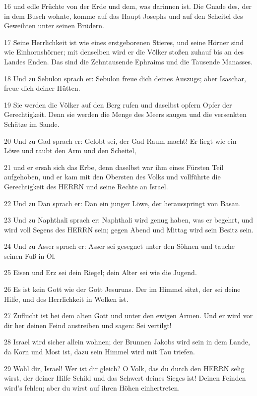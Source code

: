 \par 16 und edle Früchte von der Erde und dem, was darinnen ist. Die Gnade des, der in dem Busch wohnte, komme auf das Haupt Josephs und auf den Scheitel des Geweihten unter seinen Brüdern.
\par 17 Seine Herrlichkeit ist wie eines erstgeborenen Stieres, und seine Hörner sind wie Einhornshörner; mit denselben wird er die Völker stoßen zuhauf bis an des Landes Enden. Das sind die Zehntausende Ephraims und die Tausende Manasses.
\par 18 Und zu Sebulon sprach er: Sebulon freue dich deines Auszugs; aber Isaschar, freue dich deiner Hütten.
\par 19 Sie werden die Völker auf den Berg rufen und daselbst opfern Opfer der Gerechtigkeit. Denn sie werden die Menge des Meers saugen und die versenkten Schätze im Sande.
\par 20 Und zu Gad sprach er: Gelobt sei, der Gad Raum macht! Er liegt wie ein Löwe und raubt den Arm und den Scheitel,
\par 21 und er ersah sich das Erbe, denn daselbst war ihm eines Fürsten Teil aufgehoben, und er kam mit den Obersten des Volks und vollführte die Gerechtigkeit des HERRN und seine Rechte an Israel.
\par 22 Und zu Dan sprach er: Dan ein junger Löwe, der herausspringt von Basan.
\par 23 Und zu Naphthali sprach er: Naphthali wird genug haben, was er begehrt, und wird voll Segens des HERRN sein; gegen Abend und Mittag wird sein Besitz sein.
\par 24 Und zu Asser sprach er: Asser sei gesegnet unter den Söhnen und tauche seinen Fuß in Öl.
\par 25 Eisen und Erz sei dein Riegel; dein Alter sei wie die Jugend.
\par 26 Es ist kein Gott wie der Gott Jesuruns. Der im Himmel sitzt, der sei deine Hilfe, und des Herrlichkeit in Wolken ist.
\par 27 Zuflucht ist bei dem alten Gott und unter den ewigen Armen. Und er wird vor dir her deinen Feind austreiben und sagen: Sei vertilgt!
\par 28 Israel wird sicher allein wohnen; der Brunnen Jakobs wird sein in dem Lande, da Korn und Most ist, dazu sein Himmel wird mit Tau triefen.
\par 29 Wohl dir, Israel! Wer ist dir gleich? O Volk, das du durch den HERRN selig wirst, der deiner Hilfe Schild und das Schwert deines Sieges ist! Deinen Feinden wird's fehlen; aber du wirst auf ihren Höhen einhertreten.

